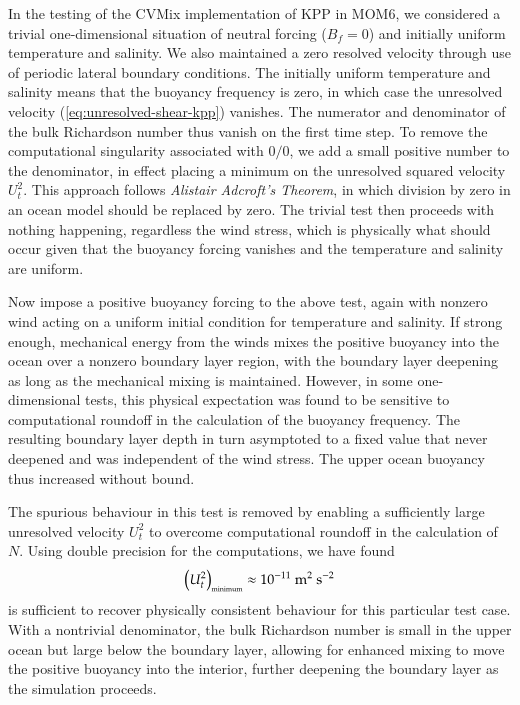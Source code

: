 \mbox{}
\newline 

In the testing of the CVMix implementation of KPP in MOM6, we
considered a trivial one-dimensional situation of neutral forcing
($B_{f} = 0$) and initially uniform temperature and salinity.  We also
maintained a zero resolved velocity through use of periodic lateral
boundary conditions.  The initially uniform temperature and salinity
means that the buoyancy frequency is zero, in which case the
unresolved velocity (\ref{eq:unresolved-shear-kpp}) vanishes.  The
numerator and denominator of the bulk Richardson number thus vanish on
the first time step.  To remove the computational singularity
associated with $0/0$, we add a small positive number to the
denominator, in effect placing a minimum on the unresolved squared
velocity $U_{t}^{2}$.  This approach follows {\it Alistair Adcroft's
  Theorem}, in which division by zero in an ocean model should be
replaced by zero.  The trivial test then proceeds with nothing
happening, regardless the wind stress, which is physically what should
occur given that the buoyancy forcing vanishes and the temperature and
salinity are uniform.

Now impose a positive buoyancy forcing to the above test, again with
nonzero wind acting on a uniform initial condition for temperature and
salinity.  If strong enough, mechanical energy from the winds mixes
the positive buoyancy into the ocean over a nonzero boundary layer
region, with the boundary layer deepening as long as the mechanical
mixing is maintained.  However, in some one-dimensional tests, this
physical expectation was found to be sensitive to computational
roundoff in the calculation of the buoyancy frequency.  The resulting
boundary layer depth in turn asymptoted to a fixed value that never
deepened and was independent of the wind stress.  The upper ocean
buoyancy thus increased without bound.  

The spurious behaviour in this test is removed by enabling a
sufficiently large unresolved velocity $U_{t}^{2}$ to overcome
computational roundoff in the calculation of $N$.  Using double
precision for the computations, we have found
\begin{equation}
  \left( U_{t}^{2} \right)_{\mbox{\tiny minimum}} \approx 10^{-11}~\mbox{m}^{2}~\mbox{s}^{-2}  
\end{equation}
is sufficient to recover physically consistent behaviour for this
particular test case.  With a nontrivial denominator, the bulk
Richardson number is small in the upper ocean but large below the
boundary layer, allowing for enhanced mixing to move the positive
buoyancy into the interior, further deepening the boundary layer as
the simulation proceeds.


